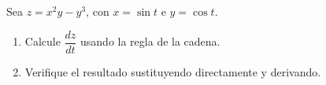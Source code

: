 Sea $z = x^2 y - y^3$, con $x = \sin t$ e $y = \cos t$.
\begin{enumerate}
    \item Calcule $\dfrac{dz}{dt}$ usando la regla de la cadena.
    \item Verifique el resultado sustituyendo directamente y derivando.
\end{enumerate}
